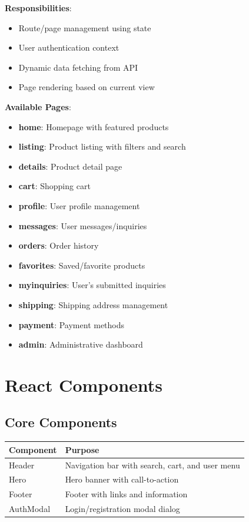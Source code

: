 \documentclass[12pt,a4paper]{report}
\begin{document}
\textbf{Responsibilities}:
\begin{itemize}
    \item Route/page management using state
    \item User authentication context
    \item Dynamic data fetching from API
    \item Page rendering based on current view
\end{itemize}

\textbf{Available Pages}:
\begin{itemize}
    \item \textbf{home}: Homepage with featured products
    \item \textbf{listing}: Product listing with filters and search
    \item \textbf{details}: Product detail page
    \item \textbf{cart}: Shopping cart
    \item \textbf{profile}: User profile management
    \item \textbf{messages}: User messages/inquiries
    \item \textbf{orders}: Order history
    \item \textbf{favorites}: Saved/favorite products
    \item \textbf{myinquiries}: User's submitted inquiries
    \item \textbf{shipping}: Shipping address management
    \item \textbf{payment}: Payment methods
    \item \textbf{admin}: Administrative dashboard
\end{itemize}

\section{React Components}

\subsection{Core Components}

\begin{longtable}{|p{3cm}|p{5cm}|}
\hline
\textbf{Component} & \textbf{Purpose} \\
\hline
Header & Navigation bar with search, cart, and user menu \\
\hline
Hero & Hero banner with call-to-action \\
\hline
Footer & Footer with links and information \\
\hline
AuthModal & Login/registration modal dialog \\
\hline
\end{longtable}
\end{document}

